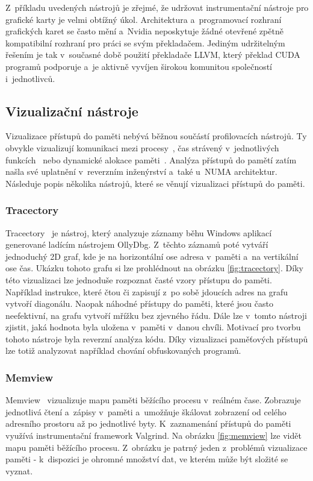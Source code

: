 Z~příkladu uvedených nástrojů je zřejmé, že udržovat instrumentační nástroje pro grafické karty je velmi obtížný úkol. Architektura a~programovací rozhraní grafických karet se často mění a~Nvidia neposkytuje žádné otevřené zpětně kompatibilní rozhraní pro práci se svým překladačem. Jediným udržitelným řešením je tak v~současné době použití překladače LLVM, který překlad CUDA programů podporuje a~je aktivně vyvíjen širokou komunitou společností i~jednotlivců.

\subsection{Vizualizační nástroje}
Vizualizace přístupů do paměti nebývá běžnou součástí profilovacích nástrojů. Ty obvykle vizu\-alizují komunikaci mezi procesy~\cite{tau, vampir}, čas strávený v~jednotlivých funkcích~\cite{flamegraph} nebo dyna\-mické alokace paměti~\cite{gcspy, dynmem-visualisation}. Analýza přístupů do pamětí zatím našla své uplatnění v~reverzním inženýrství a~také u~NUMA architektur. Následuje popis několika nástrojů, které se věnují vizualizaci přístupů do paměti.

\subsubsection*{Tracectory}
Tracectory~\cite{tracectory} je nástroj, který analyzuje záznamy běhu Windows aplikací generované ladícím nástrojem OllyDbg. Z~těchto záznamů poté vytváří jednoduchý 2D graf, kde je na horizontální ose adresa v~paměti a~na vertikální ose čas. Ukázku tohoto grafu si lze prohlédnout na obrázku \ref{fig:tracectory}. Díky této vizualizaci lze jednoduše rozpoznat časté vzory přístupu do paměti. Například instrukce, které čtou či zapisují z~po sobě jdoucích adres na grafu vytvoří diagonálu. Naopak náhodné přístupy do paměti, které jsou často neefektivní, na grafu vytvoří mřížku bez zjevného řádu. Dále lze v~tomto nástroji zjistit, jaká hodnota byla uložena v~paměti v~danou chvíli. Motivací pro tvorbu tohoto nástroje byla reverzní analýza kódu. Díky vizualizaci paměťových přístupů lze totiž analyzovat například chování obfuskovaných programů.

\subsubsection*{Memview}
Memview~\cite{memview} vizualizuje mapu paměti běžícího procesu v~reálném čase. Zobrazuje jednotlivá čtení a~zápisy v~paměti a~umožňuje škálovat zobrazení od celého adresního prostoru až po jednotlivé byty. K~zaznamenání přístupů do paměti využívá instrumentační framework Valgrind. Na obrázku \ref{fig:memview} lze vidět mapu paměti běžícího procesu. Z~obrázku je patrný jeden z~problémů vizualizace paměti - k~dispozici je ohromné množství dat, ve kterém může být složité se vyznat.

